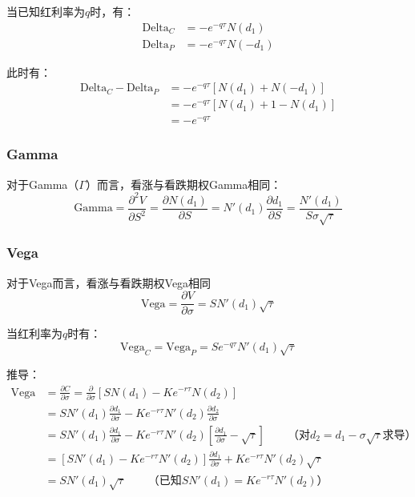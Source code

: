 \documentclass[11pt]{article}
\begin{document}
当已知红利率为$q$时，有：
\begin{align*}
    \text{Delta}_C &= -e^{-q\tau} N(d_1) \\
    \text{Delta}_P &= -e^{-q\tau} N(-d_1)
\end{align*}

此时有：
\begin{align*}
    \text{Delta}_C - \text{Delta}_P 
    &= -e^{-q\tau} \left[ N(d_1) + N(-d_1) \right] \\
    &= -e^{-q\tau} \left[ N(d_1) + 1 - N(d_1) \right] \\
    &= -e^{-q\tau}
\end{align*}

\subsubsection{Gamma}

对于Gamma（$\Gamma$）而言，看涨与看跌期权Gamma相同：
\begin{equation*}
    \text{Gamma} = \frac{\partial^2 V}{\partial S^2} = \frac{\partial N(d_1)}{\partial S} = N'(d_1)\frac{\partial d_1}{\partial S} = \frac{N'(d_1)}{S\sigma\sqrt{\tau}}
\end{equation*}

\subsubsection{Vega}

对于Vega而言，看涨与看跌期权Vega相同
\begin{equation*}
    \text{Vega} = \frac{\partial V}{\partial \sigma}  = SN'(d_1)\sqrt{\tau}
\end{equation*}

当红利率为$q$时有：
\begin{equation*}
    \text{Vega}_C = \text{Vega}_P = S e^{-q\tau}N'(d_1)\sqrt{\tau}
\end{equation*}

推导：
\begin{align*}
    \text{Vega} &= \frac{\partial C}{\partial \sigma} = \frac{\partial}{\partial \sigma} \left[S N(d_1) - K e^{-r\tau}N(d_2)\right] \\
    &= S N'(d_1) \frac{\partial d_1}{\partial \sigma} - Ke^{-r\tau}N'(d_2) \frac{\partial d_2}{\partial \sigma} \\
    &= S N'(d_1) \frac{\partial d_1}{\partial \sigma} - Ke^{-r\tau}N'(d_2) \left[ \frac{\partial d_1}{\partial \sigma} -\sqrt{\tau} \right] \qquad \text{（对$d_2 = d_1 - \sigma\sqrt{\tau}$求导）} \\
    &= \left[ S N'(d_1) - Ke^{-r\tau}N'(d_2) \right] \frac{\partial d_1}{\partial \sigma} + Ke^{-r\tau}N'(d_2) \sqrt{\tau} \\
    &= S N'(d_1)\sqrt{\tau} \qquad \text{（已知$S N'(d_1) = Ke^{-r\tau}N'(d_2)$）}
\end{align*}
\end{document}
